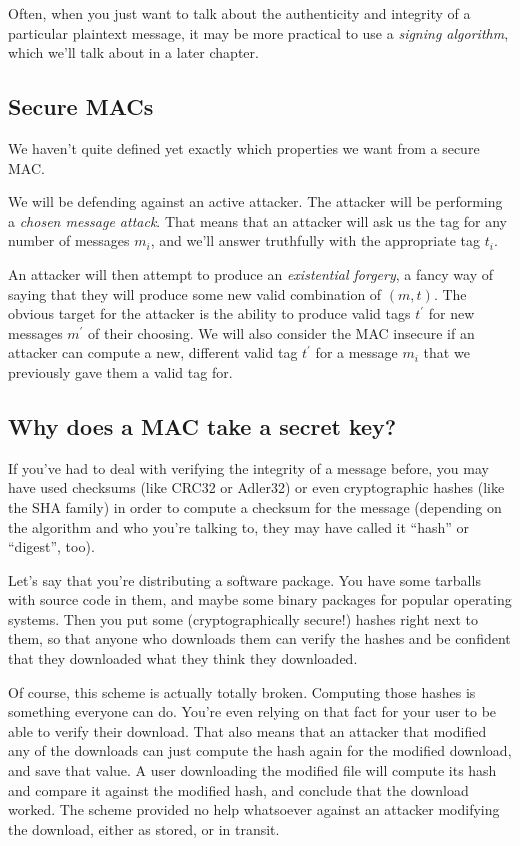 \documentclass[11pt,ebook,table,dvipsnames]{memoir}
\begin{document}
Often, when you just want to talk about the authenticity and integrity
of a particular plaintext message, it may be more practical to use a
\emph{signing algorithm}, which we'll talk about in a later chapter.

\subsection{Secure MACs}
\label{sec-2-7-1-1}

We haven't quite defined yet exactly which properties we want from a
secure MAC.

We will be defending against an active attacker. The attacker will be
performing a \emph{chosen message attack}. That means that an attacker will
ask us the tag for any number of messages $m_i$, and we'll answer
truthfully with the appropriate tag $t_i$.

An attacker will then attempt to produce an \emph{existential forgery}, a
fancy way of saying that they will produce some new valid combination
of $(m, t)$. The obvious target for the attacker is the ability to
produce valid tags $t^{\prime}$ for new messages $m^{\prime}$ of their
choosing. We will also consider the MAC insecure if an attacker can
compute a new, different valid tag $t^{\prime}$ for a message $m_i$
that we previously gave them a valid tag for.
\subsection{Why does a MAC take a secret key?}
\label{sec-2-7-1-2}

If you've had to deal with verifying the integrity of a message
before, you may have used checksums (like CRC32 or Adler32) or even
cryptographic hashes (like the SHA family) in order to compute a
checksum for the message (depending on the algorithm and who you're
talking to, they may have called it \enquote{hash} or \enquote{digest}, too).

Let's say that you're distributing a software package. You have some
tarballs with source code in them, and maybe some binary packages for
popular operating systems. Then you put some (cryptographically
secure!) hashes right next to them, so that anyone who downloads them
can verify the hashes and be confident that they downloaded what they
think they downloaded.

Of course, this scheme is actually totally broken. Computing those
hashes is something everyone can do. You're even relying on that fact
for your user to be able to verify their download. That also means
that an attacker that modified any of the downloads can just compute
the hash again for the modified download, and save that value. A user
downloading the modified file will compute its hash and compare it
against the modified hash, and conclude that the download worked. The
scheme provided no help whatsoever against an attacker modifying the
download, either as stored, or in transit.
\end{document}
